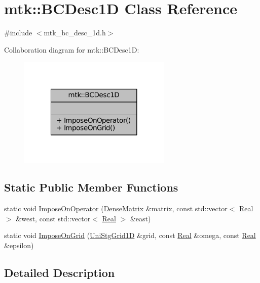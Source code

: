 \hypertarget{classmtk_1_1BCDesc1D}{\section{mtk\-:\-:B\-C\-Desc1\-D Class Reference}
\label{classmtk_1_1BCDesc1D}
}


{\ttfamily \#include $<$mtk\-\_\-bc\-\_\-desc\-\_\-1d.\-h$>$}



Collaboration diagram for mtk\-:\-:B\-C\-Desc1\-D\-:\nopagebreak
\begin{figure}[H]
\begin{center}
\leavevmode
\includegraphics[width=206pt]{classmtk_1_1BCDesc1D__coll__graph}
\end{center}
\end{figure}
\subsection*{Static Public Member Functions}
\begin{DoxyCompactItemize}
\item 
static void \hyperlink{classmtk_1_1BCDesc1D_a4dcf1ac4198402113591fde97dfa3260}{Impose\-On\-Operator} (\hyperlink{classmtk_1_1DenseMatrix}{Dense\-Matrix} \&matrix, const std\-::vector$<$ \hyperlink{group__c01-roots_gac080bbbf5cbb5502c9f00405f894857d}{Real} $>$ \&west, const std\-::vector$<$ \hyperlink{group__c01-roots_gac080bbbf5cbb5502c9f00405f894857d}{Real} $>$ \&east)
\item 
static void \hyperlink{classmtk_1_1BCDesc1D_a79a659c6a6333af8e51c463cf1ecb0b7}{Impose\-On\-Grid} (\hyperlink{classmtk_1_1UniStgGrid1D}{Uni\-Stg\-Grid1\-D} \&grid, const \hyperlink{group__c01-roots_gac080bbbf5cbb5502c9f00405f894857d}{Real} \&omega, const \hyperlink{group__c01-roots_gac080bbbf5cbb5502c9f00405f894857d}{Real} \&epsilon)
\end{DoxyCompactItemize}


\subsection{Detailed Description}


